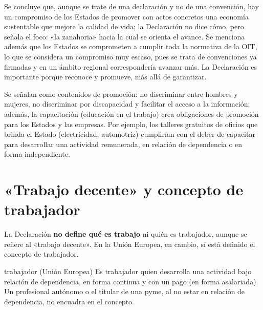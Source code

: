 \documentclass[12pt,oneside]{book}
\begin{document}
Se concluye que, aunque se trate de una declaración y no de una convención, hay un compromiso de los Estados de promover con actos concretos una economía sustentable que mejore la calidad de vida; la Declaración no dice cómo, pero señala el foco: «la zanahoria» hacia la cual se orienta el avance. Se menciona además que los Estados se comprometen a cumplir toda la normativa de la OIT, lo que se considera un compromiso muy escaso, pues se trata de convenciones ya firmadas y en un ámbito regional correspondería avanzar más. La Declaración es importante porque reconoce y promueve, más allá de garantizar.

Se señalan como contenidos de promoción: no discriminar entre hombres y mujeres, no discriminar por discapacidad y facilitar el acceso a la información; además, la capacitación (educación en el trabajo) crea obligaciones de promoción para los Estados y las empresas. Por ejemplo, los talleres gratuitos de oficios que brinda el Estado (electricidad, automotriz) cumplirían con el deber de capacitar para desarrollar una actividad remunerada, en relación de dependencia o en forma independiente.

\section{«Trabajo decente» y concepto de trabajador}

La Declaración \textbf{no define qué es trabajo} ni quién es trabajador, aunque se refiere al «trabajo decente». En la Unión Europea, en cambio, sí está definido el concepto de trabajador.

\begin{definition}{trabajador (Unión Europea)}
Es trabajador quien desarrolla una actividad bajo relación de dependencia, en forma continua y con un pago (en forma asalariada). Un profesional autónomo o el titular de una pyme, al no estar en relación de dependencia, no encuadra en el concepto.
\end{definition}
\end{document}
